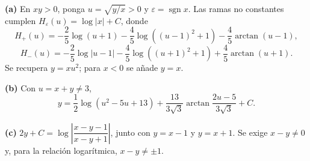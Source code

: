 \noindent\textbf{(a)} En $xy>0$, ponga $u=\sqrt{y/x}>0$ y $\varepsilon=\operatorname{sgn}x$. Las ramas no constantes cumplen $H_\varepsilon(u)=\log|x|+C$, donde\[H_+(u)=-\frac25\log(u+1)-\frac45\log((u-1)^2+1)-\frac45\arctan(u-1),\]\[H_-(u)=-\frac25\log|u-1|-\frac45\log((u+1)^2+1)+\frac45\arctan(u+1).\] Se recupera $y=xu^2$; para $x<0$ se añade $y=x$.

\noindent\textbf{(b)} Con $u=x+y\ne3$,\[y=\frac12\log(u^2-5u+13)+\frac{13}{3\sqrt3}\arctan\frac{2u-5}{3\sqrt3}+C.\]

\noindent\textbf{(c)} $2y+C=\log\left|\dfrac{x-y-1}{x-y+1}\right|$, junto con $y=x-1$ y $y=x+1$. Se exige $x-y\ne0$ y, para la relación logarítmica, $x-y\ne\pm1$.
